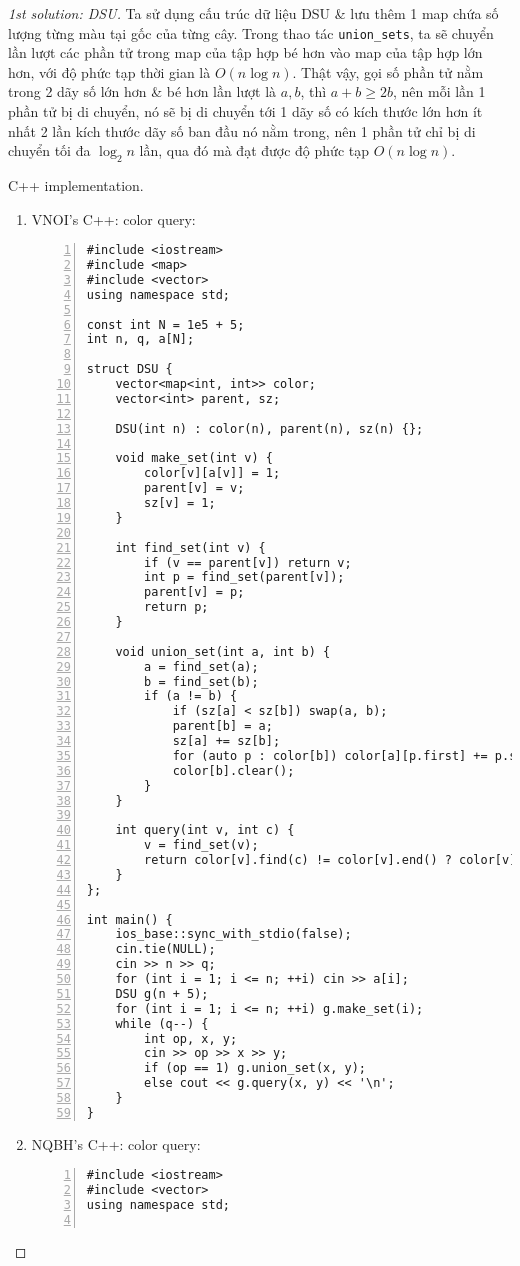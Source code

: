 \documentclass{article}
\begin{document}
\begin{proof}[1st solution: DSU]
    Ta sử dụng cấu trúc dữ liệu DSU \& lưu thêm 1 map chứa số lượng từng màu tại gốc của từng cây. Trong thao tác \verb|union_sets|, ta sẽ chuyển lần lượt các phần tử trong map của tập hợp bé hơn vào map của tập hợp lớn hơn, với độ phức tạp thời gian là $O(n\log n)$. Thật vậy, gọi số phần tử nằm trong 2 dãy số lớn hơn \& bé hơn lần lượt là $a,b$, thì $a + b\ge2b$, nên mỗi lần 1 phần tử bị di chuyển, nó sẽ bị di chuyển tới 1 dãy số có kích thước lớn hơn ít nhất 2 lần kích thước dãy số ban đầu nó nằm trong, nên 1 phần tử chỉ bị di chuyển tối đa $\log_2n$ lần, qua đó mà đạt được độ phức tạp $O(n\log n)$.
    \item {\sc C++ implementation.}
    \begin{enumerate}
        \item VNOI's C++: color query:
        \begin{Verbatim}[numbers=left,xleftmargin=5mm]
#include <iostream>
#include <map>
#include <vector>
using namespace std;

const int N = 1e5 + 5;
int n, q, a[N];

struct DSU {
    vector<map<int, int>> color;
    vector<int> parent, sz;

    DSU(int n) : color(n), parent(n), sz(n) {};

    void make_set(int v) {
        color[v][a[v]] = 1;
        parent[v] = v;
        sz[v] = 1;
    }

    int find_set(int v) {
        if (v == parent[v]) return v;
        int p = find_set(parent[v]);
        parent[v] = p;
        return p;
    }

    void union_set(int a, int b) {
        a = find_set(a);
        b = find_set(b);
        if (a != b) {
            if (sz[a] < sz[b]) swap(a, b);
            parent[b] = a;
            sz[a] += sz[b];
            for (auto p : color[b]) color[a][p.first] += p.second;
            color[b].clear();
        }
    }

    int query(int v, int c) {
        v = find_set(v);
        return color[v].find(c) != color[v].end() ? color[v][c] : 0;
    }
};

int main() {
    ios_base::sync_with_stdio(false);
    cin.tie(NULL);
    cin >> n >> q;
    for (int i = 1; i <= n; ++i) cin >> a[i];
    DSU g(n + 5);
    for (int i = 1; i <= n; ++i) g.make_set(i);
    while (q--) {
        int op, x, y;
        cin >> op >> x >> y;
        if (op == 1) g.union_set(x, y);
        else cout << g.query(x, y) << '\n';
    }
}
        \end{Verbatim}
        \item NQBH's C++: color query:
        \begin{Verbatim}[numbers=left,xleftmargin=5mm]
#include <iostream>
#include <vector>
using namespace std;


\end{Verbatim}
\end{enumerate}
\end{proof}
\end{document}
